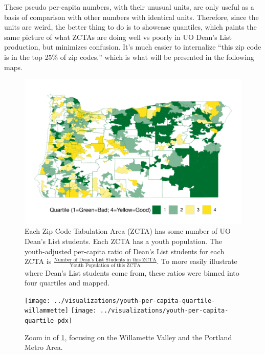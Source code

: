 \documentclass[10pt]{article}
\begin{document}
These pseudo per-capita numbers, with their unusual units, are only useful as a basis of comparison with other numbers with identical units. Therefore, since the units are weird, the better thing to do is to showcase quantiles, which paints the same picture of what ZCTAs are doing well vs poorly in UO Dean's List production, but minimizes confusion. It's much easier to internalize ``this zip code is in the top 25\% of zip codes,'' which is what will be presented in the following maps.

\begin{figure}[H]
	\centering
	\includegraphics[width=0.8\linewidth]{../visualizations/youth-per-capita-quartile}
	\caption{Each Zip Code Tabulation Area (ZCTA) has some number of UO Dean's List students. Each ZCTA has a youth population. The youth-adjusted per-capita ratio of Dean's List students for each ZCTA is $\frac{\text{Number of Dean's List Students in this ZCTA}}{\text{Youth Population of this ZCTA}}$. To more easily illustrate where Dean's List students come from, these ratios were binned into four quartiles and mapped. }
	\label{fig:youth-per-capita-quartile}
\end{figure}

\qquad

\begin{figure}[H]
	\centering
	\texttt{[image: ../visualizations/youth-per-capita-quartile-willammette]}
	\texttt{[image: ../visualizations/youth-per-capita-quartile-pdx]}
	\caption{Zoom in of \ref{fig:youth-per-capita-quartile}, focusing on the Willamette Valley and the Portland Metro Area.}
	\label{fig:youth-per-capita-quartile-closeup}
\end{figure}

\qquad
\end{document}
